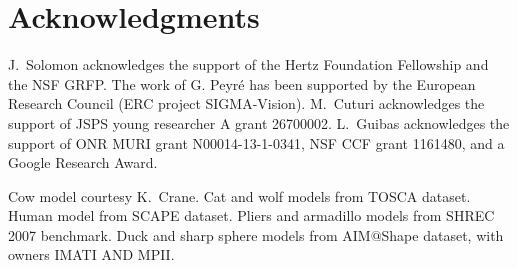 
\section*{Acknowledgments}

J.\ Solomon acknowledges the support of the Hertz Foundation Fellowship and the NSF GRFP.
The work of G. Peyr\'e has been supported by the European Research Council (ERC project SIGMA-Vision).
M.\ Cuturi acknowledges the support of JSPS young researcher A grant 26700002.
L.\ Guibas acknowledges the support of ONR MURI grant  N00014-13-1-0341, NSF CCF grant 1161480, and a Google Research Award. 

Cow model courtesy K.\ Crane.  Cat and wolf models from TOSCA dataset.  Human model from SCAPE dataset.  Pliers and armadillo models from SHREC 2007 benchmark.  Duck and sharp sphere models from AIM$@$Shape dataset, with owners IMATI AND MPII.